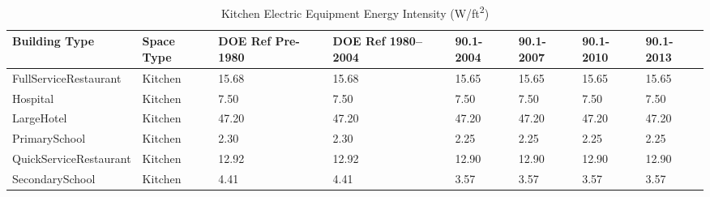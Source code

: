 \begin{table}[h]
\small
\centering
\caption[Kitchen Electric Equipment Energy Intensity]{Kitchen Electric Equipment Energy Intensity (W/ft\textsuperscript{2})}
\label{tab:kitchen_epds}
\begin{tabular}{|p{1.27in}|p{0.48in}|p{0.5in}|p{0.5in}|p{0.5in}|p{0.5in}|p{0.5in}|p{0.5in}|}
\hline
\textbf{Building Type} & \textbf{Space Type} & \textbf{DOE Ref Pre-1980} & \textbf{DOE Ref 1980--2004} & \textbf{90.1-2004} & \textbf{90.1-2007} & \textbf{90.1-2010} & \textbf{90.1-2013} \\ \hline
FullServiceRestaurant  & Kitchen  & 15.68  & 15.68 & 15.65 & 15.65 & 15.65 & 15.65 \\ \hline
Hospital               & Kitchen  & 7.50   & 7.50  & 7.50  & 7.50  & 7.50  & 7.50  \\ \hline
LargeHotel             & Kitchen  & 47.20  & 47.20 & 47.20 & 47.20 & 47.20 & 47.20 \\ \hline
PrimarySchool          & Kitchen  & 2.30   & 2.30  & 2.25  & 2.25  & 2.25  & 2.25  \\ \hline
QuickServiceRestaurant & Kitchen  & 12.92  & 12.92 & 12.90 & 12.90 & 12.90 & 12.90 \\ \hline
SecondarySchool        & Kitchen  & 4.41   & 4.41  & 3.57  & 3.57  & 3.57  & 3.57  \\ \hline
\end{tabular}
\end{table}